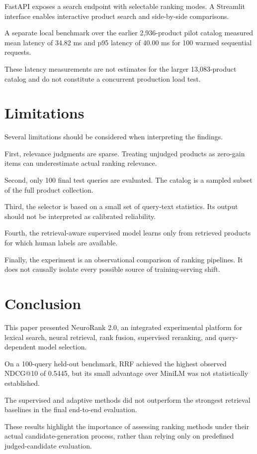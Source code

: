 \documentclass[conference]{IEEEtran}
\begin{document}
FastAPI exposes a search endpoint
with selectable ranking modes.
A Streamlit interface enables
interactive product search and
side-by-side comparisons.

A separate local benchmark over
the earlier 2,936-product pilot
catalog measured mean latency
of 34.82 ms and p95 latency
of 40.00 ms for 100 warmed
sequential requests.

These latency measurements are
not estimates for the larger
13,083-product catalog and do
not constitute a concurrent
production load test.

\section{Limitations}

Several limitations should be
considered when interpreting
the findings.

First, relevance judgments are
sparse. Treating unjudged
products as zero-gain items
can underestimate actual
ranking relevance.

Second, only 100 final test
queries are evaluated.
The catalog is a sampled
subset of the full product
collection.

Third, the selector is based
on a small set of query-text
statistics. Its output should
not be interpreted as
calibrated reliability.

Fourth, the retrieval-aware
supervised model learns only
from retrieved products for
which human labels are available.

Finally, the experiment is
an observational comparison of
ranking pipelines. It does not
causally isolate every possible
source of training-serving shift.

\section{Conclusion}

This paper presented NeuroRank 2.0,
an integrated experimental platform
for lexical search, neural retrieval,
rank fusion, supervised reranking,
and query-dependent model selection.

On a 100-query held-out benchmark,
RRF achieved the highest observed
NDCG@10 of 0.5445, but its small
advantage over MiniLM was not
statistically established.

The supervised and adaptive methods
did not outperform the strongest
retrieval baselines in the final
end-to-end evaluation.

These results highlight the
importance of assessing ranking
methods under their actual
candidate-generation process,
rather than relying only on
predefined judged-candidate
evaluation.
\end{document}
